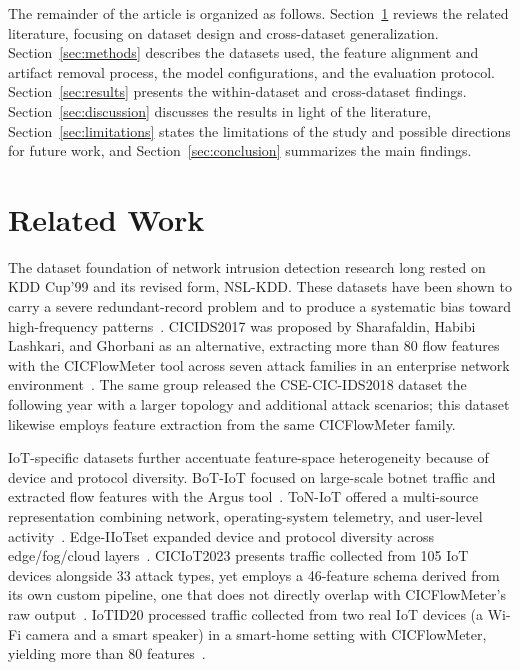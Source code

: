\documentclass[a4paper,fleqn]{cas-sc}
\begin{document}
The remainder of the article is organized as follows. Section~\ref{sec:related} reviews the related literature, focusing on dataset design and cross-dataset generalization. Section~\ref{sec:methods} describes the datasets used, the feature alignment and artifact removal process, the model configurations, and the evaluation protocol. Section~\ref{sec:results} presents the within-dataset and cross-dataset findings. Section~\ref{sec:discussion} discusses the results in light of the literature, Section~\ref{sec:limitations} states the limitations of the study and possible directions for future work, and Section~\ref{sec:conclusion} summarizes the main findings.

\FloatBarrier
\section{Related Work}
\label{sec:related}

The dataset foundation of network intrusion detection research long rested on KDD Cup'99 and its revised form, NSL-KDD. These datasets have been shown to carry a severe redundant-record problem and to produce a systematic bias toward high-frequency patterns~\cite{Tavallaee2009}. CICIDS2017 was proposed by Sharafaldin, Habibi Lashkari, and Ghorbani as an alternative, extracting more than 80 flow features with the CICFlowMeter tool across seven attack families in an enterprise network environment~\cite{Sharafaldin2018}. The same group released the CSE-CIC-IDS2018 dataset the following year with a larger topology and additional attack scenarios; this dataset likewise employs feature extraction from the same CICFlowMeter family.

IoT-specific datasets further accentuate feature-space heterogeneity because of device and protocol diversity. BoT-IoT focused on large-scale botnet traffic and extracted flow features with the Argus tool~\cite{Koroniotis2019}. ToN-IoT offered a multi-source representation combining network, operating-system telemetry, and user-level activity~\cite{Alsaedi2020}. Edge-IIoTset expanded device and protocol diversity across edge/fog/cloud layers~\cite{Ferrag2022}. CICIoT2023 presents traffic collected from 105 IoT devices alongside 33 attack types, yet employs a 46-feature schema derived from its own custom pipeline, one that does not directly overlap with CICFlowMeter's raw output~\cite{Neto2023}. IoTID20 processed traffic collected from two real IoT devices (a Wi-Fi camera and a smart speaker) in a smart-home setting with CICFlowMeter, yielding more than 80 features~\cite{Ullah2020}.
\end{document}
